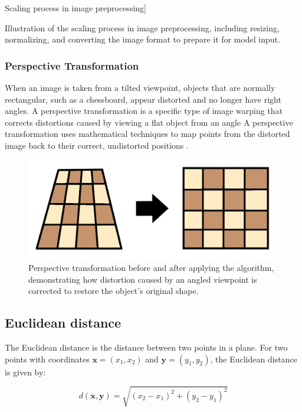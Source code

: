 Scaling process in image preprocessing]{Illustration of the scaling process in image preprocessing, including resizing, normalizing, and converting the image format to prepare it for model input.

\subsubsection*{Perspective Transformation}

When an image is taken from a tilted viewpoint, objects that are normally rectangular, such as a chessboard, appear distorted and no longer have right angles. A perspective transformation is a specific type of image warping that corrects distortions caused by viewing a flat object from an angle A perspective transformation uses mathematical techniques to map points from the distorted image back to their correct, undistorted positions \cite{nvidia:perspective-transform}.


\begin{figure}[h!]
    \centering
    \includegraphics[width=0.75\linewidth]{figures/theory/image-recognition/perspective-transformation.png}
    \caption[Perspective transformation before and after]{Perspective transformation before and after applying the algorithm, demonstrating how distortion caused by an angled viewpoint is corrected to restore the object’s original shape.}
    \label{fig:perspective-transformation}
\end{figure}



\subsection{Euclidean distance}

The Euclidean distance is the distance between two points in a plane. For two points with coordinates \( \mathbf{x} = (x_1, x_2) \) and \( \mathbf{y} = (y_1, y_2) \), the Euclidean distance is given by:

\[
d(\mathbf{x}, \mathbf{y}) = \sqrt{(x_2 - x_1)^2 + (y_2 - y_1)^2}
\]

}

